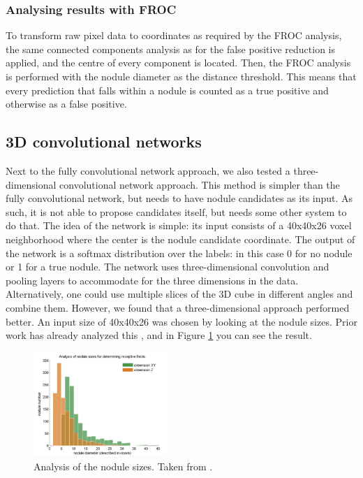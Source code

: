 \documentclass{article}
\begin{document}
\subsubsection{Analysing results with FROC}
To transform raw pixel data to coordinates as required by the FROC analysis, the same connected components analysis as for the false positive reduction is applied, and the centre of every component is located. Then, the FROC analysis is performed with the nodule diameter as the distance threshold. This means that every prediction that falls within a nodule is counted as a true positive and otherwise as a false positive.

\subsection{3D convolutional networks}
Next to the fully convolutional network approach, we also tested a three-dimensional convolutional network approach.
This method is simpler than the fully convolutional network, but needs to have nodule candidates as its input.
As such, it is not able to propose candidates itself, but needs some other system to do that.
The idea of the network is simple: its input consists of a 40x40x26 voxel neighborhood where the center is the nodule candidate coordinate.
The output of the network is a softmax distribution over the labels: in this case 0 for no nodule or 1 for a true nodule.
The network uses three-dimensional convolution and pooling layers to accommodate for the three dimensions in the data.
Alternatively, one could use multiple slices of the 3D cube in different angles and combine them.
However, we found that a three-dimensional approach performed better.
An input size of 40x40x26 was chosen by looking at the nodule sizes.
Prior work has already analyzed this \cite{qidou}, and in Figure \ref{fig:nodulesizes} you can see the result.

\begin{figure}[tb]
	\centering
	\includegraphics[width=0.45\textwidth]{nodulesizes.png}
	\caption{Analysis of the nodule sizes. Taken from \cite{qidou}.}
	\label{fig:nodulesizes}
\end{figure}
\end{document}
